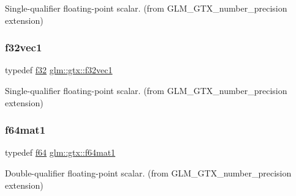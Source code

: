 Single-\/qualifier floating-\/point scalar. (from G\+L\+M\+\_\+\+G\+T\+X\+\_\+number\+\_\+precision extension) 

\mbox{\label{group__gtx__number__precision_gadab8e598b0b4697629482682bdb7f223}} 
\subsubsection{\texorpdfstring{f32vec1}{f32vec1}}
{\footnotesize\ttfamily typedef \hyperlink{group__gtc__type__precision_ga0ec999b57f5330d9021256e96038df04}{f32} \hyperlink{group__gtx__number__precision_gadab8e598b0b4697629482682bdb7f223}{glm\+::gtx\+::f32vec1}}



Single-\/qualifier floating-\/point scalar. (from G\+L\+M\+\_\+\+G\+T\+X\+\_\+number\+\_\+precision extension) 

\mbox{\label{group__gtx__number__precision_ga23f8f53c78b50aa07a113c3d07d01bc9}} 
\subsubsection{\texorpdfstring{f64mat1}{f64mat1}}
{\footnotesize\ttfamily typedef \hyperlink{group__gtc__type__precision_ga2bba392e555124b36cde6abba349bab3}{f64} \hyperlink{group__gtx__number__precision_ga23f8f53c78b50aa07a113c3d07d01bc9}{glm\+::gtx\+::f64mat1}}



Double-\/qualifier floating-\/point scalar. (from G\+L\+M\+\_\+\+G\+T\+X\+\_\+number\+\_\+precision extension) 

\mbox{\label{group__gtx__number__precision_ga710a5952d78b22635c71c5fc2c0a3319}} 
